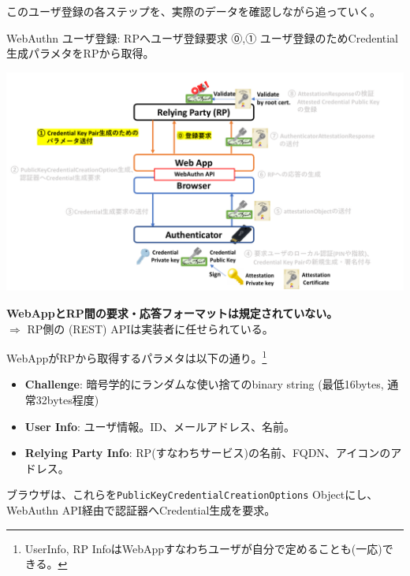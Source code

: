 \documentclass[12pt,dvipdfmx,uplatex]{beamer}
\begin{document}
\begin{frame}
このユーザ登録の各ステップを、実際のデータを確認しながら追っていく。
\end{frame}

\begin{frame}{WebAuthn ユーザ登録: RPへユーザ登録要求}
⓪,① ユーザ登録のためCredential生成パラメタをRPから取得。
\begin{center}
\includegraphics[width=0.9\linewidth]{Figs/webauthn-registration1.pdf}
\end{center}
\textbf{WebAppとRP間の要求・応答フォーマットは規定されていない。}\\
$\Rightarrow$ RP側の (REST) APIは実装者に任せられている。
\end{frame}

\begin{frame}
WebAppがRPから取得するパラメタは以下の通り。\footnote[frame]{\scriptsize UserInfo, RP InfoはWebAppすなわちユーザが自分で定めることも(一応)できる。}
\begin{itemize}
 \item \textbf{Challenge}: \alert{暗号学的にランダムな使い捨てのbinary string (最低16bytes, 通常32bytes程度)}
 \item \textbf{User Info}: ユーザ情報。ID、メールアドレス、名前。
 \item \textbf{Relying Party Info}: RP(すなわちサービス)の名前、FQDN、アイコンのアドレス。
\end{itemize}

\vspace{2ex}
ブラウザは、これらを\texttt{PublicKeyCredentialCreationOptions} Objectにし、WebAuthn API経由で認証器へCredential生成を要求。

\end{frame}
\end{document}
